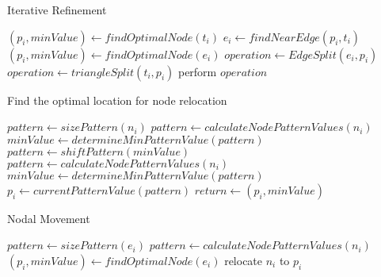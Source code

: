 \begin{algorithm}[H]
\caption{Iterative Refinement}
\label{alg_IterativeRefinement}
\begin{algorithmic}
 
    \State $\left( p_i, minValue \right) \gets findOptimalNode\left( t_i \right)$
      \State $e_i \gets findNearEdge\left( p_i, t_i \right)$
      \State $\left( p_i, minValue \right) \gets findOptimalNode\left( e_i \right)$
      \State $operation \gets EdgeSplit\left( e_i, p_i \right)$
    \Else
      \State $operation \gets triangleSplit\left( t_i, p_i \right)$
    \EndIf
      \State perform $operation$
    \EndIf
  \EndFor
\EndProcedure
\end{algorithmic}
\end{algorithm}

\begin{algorithm}
\begin{algorithmic}
\caption{Find the optimal location for node relocation}
\label{alg_NodeSmoothing}
 
  \State $pattern \gets sizePattern\left( n_i \right)$
  \State $pattern \gets calculateNodePatternValues\left( n_i \right)$
  \State $minValue \gets determineMinPatternValue\left( pattern \right)$
    \State $pattern \gets shiftPattern\left( minValue \right)$
    \State $pattern \gets calculateNodePatternValues\left( n_i \right)$
    \State $minValue \gets determineMinPatternValue\left( pattern \right)$
  \EndWhile
  \State $p_i \gets currentPatternValue\left( pattern \right)$
  \State $return \gets \left( p_i, minValue \right)$
\EndProcedure
\end{algorithmic}
\end{algorithm}

\begin{algorithm}[H]
\caption{Nodal Movement}
\begin{algorithmic}
 
    \State $pattern \gets sizePattern\left( e_i \right)$
    \State $pattern \gets calculateNodePatternValues\left( n_i \right)$
    \State $\left( p_i, minValue \right) \gets findOptimalNode\left( e_i \right)$
  \EndFor
    \State relocate $n_i$ to $p_i$
  \EndIf
\EndProcedure
\end{algorithmic}
\end{algorithm}


